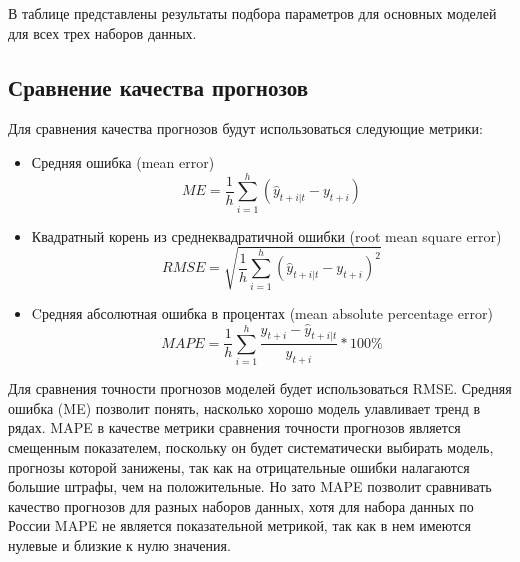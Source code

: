 \documentclass[12pt,a4paper, oneside]{extreport}
\begin{document}
В таблице представлены результаты подбора параметров для основных моделей для всех трех наборов данных. 






\subsection*{Сравнение качества прогнозов}

Для сравнения качества прогнозов будут использоваться следующие метрики:

\begin{itemize}
	\item  Средняя ошибка (mean error)
\begin{equation}\label{key}
ME = \frac{1}{h} \sum_{i=1}^h(\hat{y}_{t+i|t}-y_{t+i}) 
\end{equation}
\item  Квадратный корень из среднеквадратичной ошибки (root mean square error)
\begin{equation}\label{key}
RMSE = \sqrt{  \frac{1}{h} \sum_{i=1}^h(\hat{y}_{t+i|t}-y_{t+i})^2} 
\end{equation}
\item  Cредняя абсолютная ошибка в процентах  (mean absolute percentage error)
\begin{equation}\label{key}
MAPE = \frac{1}{h} \sum_{i=1}^h \frac{y_{t+i} - \hat{y}_{t+i|t} }{y_{t+i}} * 100\%
\end{equation}

\end{itemize}

Для сравнения точности прогнозов моделей будет использоваться RMSE. Средняя ошибка (ME) позволит понять, насколько хорошо модель улавливает тренд в рядах.  MAPE в качестве метрики сравнения точности прогнозов является смещенным показателем, поскольку он будет систематически выбирать модель, прогнозы которой занижены, так как на отрицательные ошибки налагаются большие штрафы, чем на положительные. 
Но зато MAPE позволит сравнивать качество прогнозов для разных наборов данных, хотя  для набора данных по России MAPE не является показательной метрикой, так как в нем имеются нулевые и близкие к нулю значения.
\end{document}
